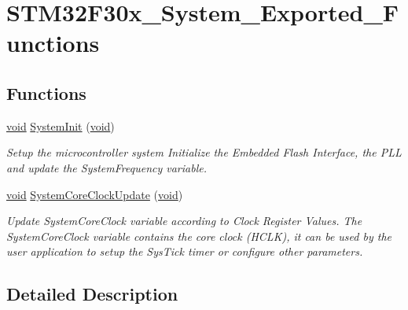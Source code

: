 \hypertarget{group___s_t_m32_f30x___system___exported___functions}{\section{S\-T\-M32\-F30x\-\_\-\-System\-\_\-\-Exported\-\_\-\-Functions}
\label{group___s_t_m32_f30x___system___exported___functions}
}
\subsection*{Functions}
\begin{DoxyCompactItemize}
\item 
\hyperlink{group___n_a_m_e_ga18028b8badbf1ea7e704ccac3c488e82}{void} \hyperlink{group___s_t_m32_f30x___system___exported___functions_ga93f514700ccf00d08dbdcff7f1224eb2}{System\-Init} (\hyperlink{group___n_a_m_e_ga18028b8badbf1ea7e704ccac3c488e82}{void})
\begin{DoxyCompactList}\small\item\em Setup the microcontroller system Initialize the Embedded Flash Interface, the P\-L\-L and update the System\-Frequency variable. \end{DoxyCompactList}\item 
\hyperlink{group___n_a_m_e_ga18028b8badbf1ea7e704ccac3c488e82}{void} \hyperlink{group___s_t_m32_f30x___system___exported___functions_gae0c36a9591fe6e9c45ecb21a794f0f0f}{System\-Core\-Clock\-Update} (\hyperlink{group___n_a_m_e_ga18028b8badbf1ea7e704ccac3c488e82}{void})
\begin{DoxyCompactList}\small\item\em Update System\-Core\-Clock variable according to Clock Register Values. The System\-Core\-Clock variable contains the core clock (H\-C\-L\-K), it can be used by the user application to setup the Sys\-Tick timer or configure other parameters. \end{DoxyCompactList}\end{DoxyCompactItemize}


\subsection{Detailed Description}



